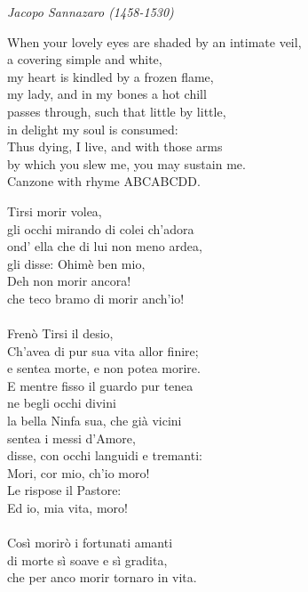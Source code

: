 \documentclass[12pt, twocolumn]{text-translation}
\begin{document}
{\raggedleft \textit{Jacopo Sannazaro (1458-1530)}\par}
\poemasterisks

When your lovely eyes are shaded by an intimate veil, \\
a covering simple and white, \\
my heart is kindled by a frozen flame, \\
my lady, and in my bones a hot chill  \\
passes through, such that little by little, \\
in delight my soul is consumed: \\
Thus dying, I live, and with those arms \\
by which you slew me, you may sustain me.  \\

Canzone with rhyme ABCABCDD.

Tirsi morir volea, \\
gli occhi mirando di colei ch'adora \\
ond' ella che di lui non meno ardea, \\
gli disse: Ohimè ben mio, \\
Deh non morir ancora! \\
che teco bramo di morir anch'io! \\
 \\
Frenò Tirsi il desio, \\
Ch'avea di pur sua vita allor finire; \\
e sentea morte, e non potea morire. \\
E mentre fisso il guardo pur tenea \\
ne begli occhi divini \\
la bella Ninfa sua, che già vicini \\
sentea i messi d'Amore, \\
disse, con occhi languidi e tremanti: \\
Mori, cor mio, ch'io moro! \\
Le rispose il Pastore: \\
Ed io, mia vita, moro! \\
 \\
Così morirò i fortunati amanti \\
di morte sì soave e sì gradita, \\
che per anco morir tornaro in vita. 
\end{document}
